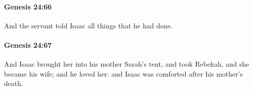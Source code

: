 		\paragraph{Genesis 24:66} %
			\label{GENESIS-24-66}

			And the servant told Isaac all things that he had done.


		\paragraph{Genesis 24:67} %
			\label{GENESIS-24-67}

			And Isaac brought her into his mother Sarah's tent, and took Rebekah, and she became his wife; and he loved her: and Isaac was comforted after his mother's death.


